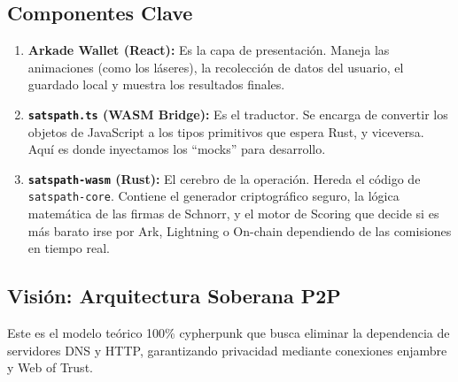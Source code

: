 \documentclass[
]{article}
\providecommand{\tightlist}{%
  \setlength{\itemsep}{0pt}\setlength{\parskip}{0pt}}
\begin{document}
\hypertarget{componentes-clave}{%
\subsection{Componentes Clave}\label{componentes-clave}}

\begin{enumerate}
\def\labelenumi{\arabic{enumi}.}
\tightlist
\item
  \textbf{Arkade Wallet (React):} Es la capa de presentación. Maneja las
  animaciones (como los láseres), la recolección de datos del usuario,
  el guardado local y muestra los resultados finales.
\item
  \textbf{\texttt{satspath.ts} (WASM Bridge):} Es el traductor. Se
  encarga de convertir los objetos de JavaScript a los tipos primitivos
  que espera Rust, y viceversa. Aquí es donde inyectamos los ``mocks''
  para desarrollo.
\item
  \textbf{\texttt{satspath-wasm} (Rust):} El cerebro de la operación.
  Hereda el código de \texttt{satspath-core}. Contiene el generador
  criptográfico seguro, la lógica matemática de las firmas de Schnorr, y
  el motor de Scoring que decide si es más barato irse por Ark,
  Lightning o On-chain dependiendo de las comisiones en tiempo real.
\end{enumerate}

\hypertarget{visiuxf3n-arquitectura-soberana-p2p}{%
\subsection{Visión: Arquitectura Soberana
P2P}\label{visiuxf3n-arquitectura-soberana-p2p}}

Este es el modelo teórico 100\% cypherpunk que busca eliminar la
dependencia de servidores DNS y HTTP, garantizando privacidad mediante
conexiones enjambre y Web of Trust.
\end{document}

